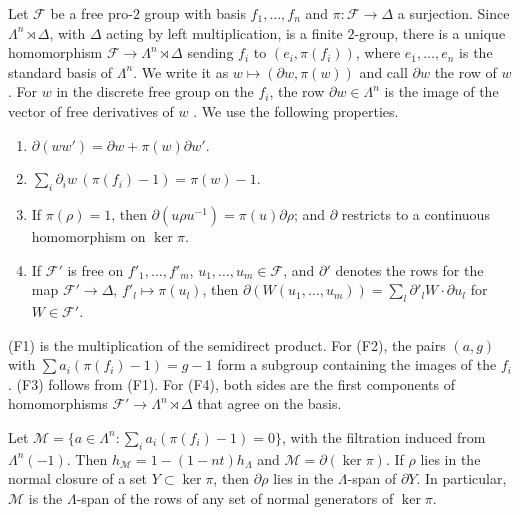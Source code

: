 Let $\mathcal F$ be a free pro-$2$ group with basis $f_1,\dots,f_n$ and
$\pi\colon\mathcal F\to\Delta$ a surjection. Since $\Lambda^n\rtimes\Delta$,
with $\Delta$ acting by left multiplication, is a finite $2$-group, there is
a unique homomorphism $\mathcal F\to\Lambda^n\rtimes\Delta$ sending $f_i$ to
$(e_i,\pi(f_i))$, where $e_1,\dots,e_n$ is the standard basis of $\Lambda^n$.
We write it as $w\mapsto(\partial w,\pi(w))$ and call $\partial w$ the row of
$w$. For $w$ in the discrete free group on the $f_i$, the row
$\partial w\in\Lambda^n$ is the image of the vector of free derivatives of $w$
\cite[Section~2]{Fox1953}. We use the following properties.
\begin{enumerate}
\item[(F1)] $\partial(ww')=\partial w+\pi(w)\partial w'$.
\item[(F2)] $\sum_i\partial_iw\,(\pi(f_i)-1)=\pi(w)-1$.
\item[(F3)] If $\pi(\rho)=1$, then $\partial(u\rho u^{-1})=\pi(u)\partial\rho$;
 and $\partial$ restricts to a continuous homomorphism on $\ker\pi$.
\item[(F4)] If $\mathcal F'$ is free on $f'_1,\dots,f'_m$,
 $u_1,\dots,u_m\in\mathcal F$, and $\partial'$ denotes the rows for the map
 $\mathcal F'\to\Delta$, $f'_l\mapsto\pi(u_l)$, then
 $\partial(W(u_1,\dots,u_m))=\sum_l\partial'_lW\cdot\partial u_l$ for
 $W\in\mathcal F'$.
\end{enumerate}
(F1) is the multiplication of the semidirect product. For (F2), the pairs
$(a,g)$ with $\sum a_i(\pi(f_i)-1)=g-1$ form a subgroup containing the
images of the $f_i$. (F3) follows from (F1). For (F4), both sides are the first
components of homomorphisms $\mathcal F'\to\Lambda^n\rtimes\Delta$ that agree
on the basis.

\begin{lemma}\label{tw:fox-rows}
Let $\mathcal M=\{a\in\Lambda^n:\sum_ia_i(\pi(f_i)-1)=0\}$, with the
filtration induced from $\Lambda^n(-1)$. Then
$h_{\mathcal M}=1-(1-nt)h_\Lambda$ and $\mathcal M=\partial(\ker\pi)$. If
$\rho$ lies in the normal closure of a set $Y\subset\ker\pi$, then
$\partial\rho$ lies in the $\Lambda$-span of $\partial Y$. In particular,
$\mathcal M$ is the $\Lambda$-span of the rows of any set of normal
generators of $\ker\pi$.
\end{lemma}

